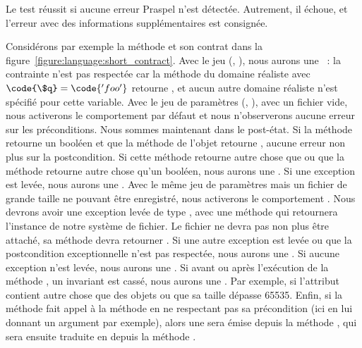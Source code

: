 Le test réussit si aucune erreur Praspel n'est détectée. Autrement, il échoue,
et l'erreur avec des informations supplémentaires est consignée.

\begin{example}

Considérons par exemple la méthode  et son contrat dans la
figure~\ref{figure:language:short_contract}.
%
Avec le jeu (, ), nous aurons une ~: la contrainte  n'est pas respectée car la
méthode  du domaine réaliste  avec $\code{\$q}
= \code{'foo'}$ retourne , et aucun autre domaine réaliste n'est
spécifié pour cette variable.
%
Avec le jeu de paramètres (, ), avec un fichier
vide, nous activerons le comportement par défaut et nous n'observerons aucune
erreur sur les préconditions. Nous sommes maintenant dans le post-état. Si la
méthode  retourne un booléen et que la méthode  de
l'objet  retourne , aucune erreur non plus sur la
postcondition.  Si cette méthode retourne autre chose que  ou que la
méthode  retourne autre chose qu'un booléen, nous aurons une
. Si une exception est levée, nous aurons une
.
%
Avec le même jeu de paramètres mais un fichier de grande taille ne pouvant être
enregistré, nous activerons le comportement . Nous devrons avoir une
exception levée de type , avec une méthode
 qui retournera l'instance de notre système de fichier. Le
fichier ne devra pas non plus être attaché, \ie sa méthode 
devra retourner . Si une autre exception est levée ou que la
postcondition exceptionnelle n'est pas respectée, nous aurons une
. Si aucune exception n'est levée, nous aurons une
.
%
Si avant ou après l'exécution de la méthode , un invariant est
cassé, nous aurons une . Par exemple, si l'attribut
 contient autre chose que des objets  ou que sa taille
dépasse 65535.
%
Enfin, si la méthode  fait appel à la méthode  en ne
respectant pas sa précondition (ici en lui donnant un argument par exemple),
alors une  sera émise depuis la méthode
, qui sera ensuite traduite en  depuis la méthode .

\end{example}
